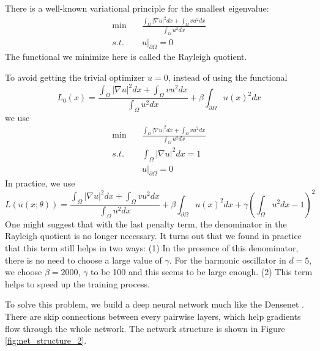 \documentclass[a4paper,12pt]{article}
\begin{document}
There is a well-known variational principle for the smallest eigenvalue:
\begin{equation}
\begin{aligned}
\min \quad &\frac{\int_{\Omega} |\nabla u|^2 dx + \int_{\Omega} vu^2dx}{\int_{\Omega} u^2 dx}\\
s.t. \quad &u|_{\partial \Omega}=0
\end{aligned}
\end{equation}
The functional we minimize here is called the Rayleigh quotient.

To avoid getting the trivial optimizer $u = 0$, instead of using the
functional
$$L_0(x)=\frac{\int_{\Omega} |\nabla u|^2 dx 
+ \int_{\Omega} vu^2dx}{\int_{\Omega} u^2 dx} 
+ \beta \int_{\partial \Omega} u(x)^2 dx
$$ 
we use
\begin{equation}
\begin{aligned}
\min &\quad \frac{\int_{\Omega} |\nabla u|^2 dx + \int_{\Omega} vu^2dx}{\int_{\Omega} u^2 dx}\\
s.t. &\quad {\int_{\Omega} |\nabla u|^2 dx}=1\\
&\quad u|_{\partial \Omega}=0
\end{aligned}
\end{equation}
In practice, we use
\begin{equation}
L(u(x;\theta))=\frac{\int_{\Omega} |\nabla u|^2 dx 
+ \int_{\Omega} vu^2 dx}{\int_{\Omega} u^2 dx} 
+\beta \int_{\partial \Omega}u(x)^2 dx 
+ \gamma \left(\int_\Omega u^2 dx-1\right)^2
\end{equation}
One might suggest that with the last penalty term, the denominator in the
Rayleigh quotient is no longer necessary.  It turns out that we found
in practice that this term still helps in two ways: (1) In the presence of
this denominator, there is no need to choose a large value of $\gamma$.
For the harmonic oscillator in $d=5$, we choose
$\beta =2000$,  $\gamma$ to be 100 and this seems to be
large enough.  (2) This term helps
to speed up the training process.



To solve this problem, we build a deep neural network much like the Densenet \cite{densenet}. 
There are skip connections between every pairwise layers, which help gradients flow through the whole network. The network structure is shown in Figure \ref{fig:net_structure_2}.
\end{document}
